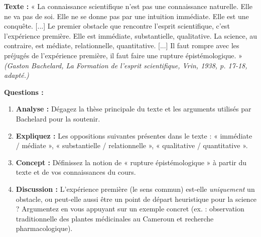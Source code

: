 \documentclass[11pt]{article}
\newcommand{\cle}[1]{{\popxbold\color{popdark}#1}}
\begin{document}
\begin{exercice}
\textbf{Texte :} « La connaissance scientifique n'est pas une connaissance naturelle. Elle ne va pas de soi. Elle ne se donne pas par une intuition immédiate. Elle est une conquête. [...] Le premier obstacle que rencontre l'esprit scientifique, c'est l'expérience première. Elle est immédiate, substantielle, qualitative. La science, au contraire, est médiate, relationnelle, quantitative. [...] Il faut rompre avec les préjugés de l'expérience première, il faut faire une rupture épistémologique. »
\emph{(Gaston Bachelard, La Formation de l'esprit scientifique, Vrin, 1938, p. 17-18, adapté.)}

\textbf{Questions :}
\begin{enumerate}
    \item \textbf{Analyse :} Dégagez la thèse principale du texte et les arguments utilisés par Bachelard pour la soutenir.
    \item \textbf{Expliquez :} Les oppositions suivantes présentes dans le texte : « immédiate / médiate », « substantielle / relationnelle », « qualitative / quantitative ».
    \item \textbf{Concept :} Définissez la notion de « \cle{rupture épistémologique} » à partir du texte et de vos connaissances du cours.
    \item \textbf{Discussion :} L'expérience première (le sens commun) est-elle \emph{uniquement} un obstacle, ou peut-elle aussi être un point de départ heuristique pour la science ? Argumentez en vous appuyant sur un exemple concret (ex. : observation traditionnelle des plantes médicinales au Cameroun et recherche pharmacologique).
\end{enumerate}
\end{exercice}
\end{document}
